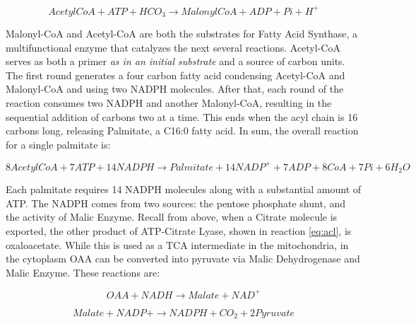 \documentclass{tufte-handout}
\begin{document}
\begin{equation}\label{eq:acc}
AcetylCoA + ATP + HCO_3 \rightarrow MalonylCoA + ADP + Pi + H^+
\end{equation}


Malonyl-CoA and Acetyl-CoA are both the substrates for Fatty Acid Synthase, a multifunctional enzyme that catalyzes the next several reactions.  Acetyl-CoA serves as both a primer \emph{as in an initial substrate} and a source of carbon units.  The first round generates a four carbon fatty acid condensing Acetyl-CoA and Malonyl-CoA and using two NADPH molecules. After that, each round of the reaction consumes two NADPH and another Malonyl-CoA, resulting in the sequential addition of carbons two at a time.  This ends when the acyl chain is 16 carbons long, releasing Palmitate, a C16:0 fatty acid. In sum, the overall reaction for a single palmitate is:

\begin{equation}\label{eq:pamitate-overall}
8 AcetylCoA + 7 ATP + 14 NADPH \rightarrow Palmitate + 14 NADP^+ + 7 ADP + 8 CoA  + 7 Pi + 6H_2O
\end{equation}


  Each palmitate requires 14 NADPH molecules along with a substantial amount of ATP.  The NADPH comes from two sources: the pentose phosphate shunt, and the activity of Malic Enzyme. Recall from above, when a Citrate molecule is exported, the other product of ATP-Citrate Lyase, shown in reaction \ref{eq:acl}, is oxaloacetate.  While this is used as a TCA intermediate in the mitochondria, in the cytoplasm OAA can be converted into pyruvate via Malic Dehydrogenase and Malic Enzyme.  These reactions are:


\begin{equation}\label{eq:me}
OAA + NADH  \rightarrow Malate + NAD^+
\end{equation}

\begin{equation}\label{eq:mdh}
Malate + NADP+  \rightarrow NADPH + CO_2 + 2 Pyruvate
\end{equation}
\end{document}
